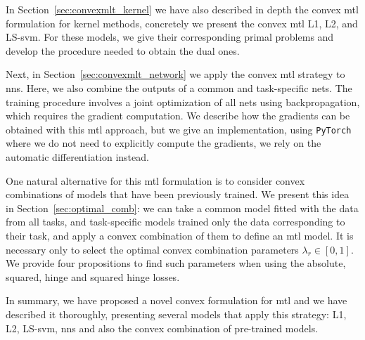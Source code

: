 %
In Section~\ref{sec:convexmlt_kernel} we have also described in depth the convex \acrshort{mtl} formulation for kernel methods, concretely we present the convex \acrshort{mtl} L1, L2, and LS-\acrshort{svm}. For these models, we give their corresponding primal problems and develop the procedure needed to obtain the dual ones.
%

Next, in Section~\ref{sec:convexmlt_network} we apply the convex \acrshort{mtl} strategy to \acrshort{nns}. Here, we also combine the outputs of a common and task-specific nets. The training procedure involves a joint optimization of all nets using backpropagation, which requires the gradient computation.
We describe how the gradients can be obtained with this \acrshort{mtl} approach, but we give an implementation, using \texttt{PyTorch} where we do not need to explicitly compute the gradients, we rely on the automatic differentiation instead.

%
One natural alternative for this \acrshort{mtl} formulation is to consider convex combinations of models that have been previously trained. We present this idea in Section~\ref{sec:optimal_comb}: we can take a common model fitted with the data from all tasks, and task-specific models trained only the data corresponding to their task, and apply a convex combination of them to define an \acrshort{mtl} model. It is necessary only to select the optimal convex combination parameters $\lambda_r \in [0, 1]$. We provide four propositions to find such parameters when using the absolute, squared, hinge and squared hinge losses.

%
In summary, we have proposed a novel convex formulation for \acrshort{mtl} and we have described it thoroughly, presenting several models that apply this strategy: L1, L2, LS-\acrshort{svm}, \acrshort{nns} and also the convex combination of pre-trained models.